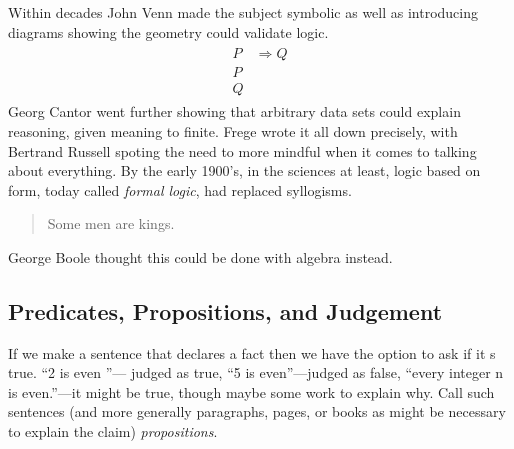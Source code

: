Within decades John Venn made the subject symbolic as 
well as introducing diagrams showing the geometry could 
validate logic.
\begin{gather}
    \tag{Modus Ponens}
    \begin{array}{rl}
        P &\Rightarrow Q\\
        P\\
    \hline 
        Q
    \end{array}
\end{gather}
Georg Cantor went further showing that arbitrary data sets could explain 
reasoning, given meaning to finite.  Frege wrote it all down precisely,
with Bertrand Russell spoting the need to more mindful when it comes to talking about everything.  By the early 1900's, in the sciences at least, logic based on form, today called \emph{formal logic}, had replaced syllogisms.
\begin{quote}
    Some men are kings.\\
    
\end{quote}



George Boole  thought 
this could be done with algebra instead.  


\subsection{Predicates, Propositions, and Judgement}
If we make a sentence that declares a fact then we have the option 
to ask if it s true.  ``2 is even ''--- judged as true, ``5 is even''---judged as false,
``every integer n is even.''---it might be true, though maybe some work to 
explain why.  Call such sentences (and more generally paragraphs, pages, or books 
as might be necessary to explain the claim) \emph{propositions}.


